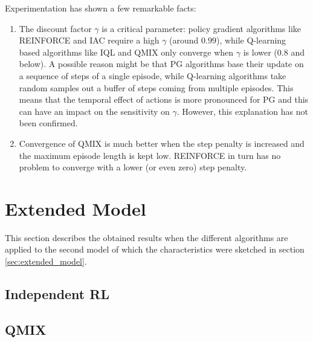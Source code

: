Experimentation has shown a few remarkable facts:
\begin{enumerate}
    \item The discount factor $\gamma$ is a critical parameter: policy gradient algorithms like REINFORCE and IAC require a high $\gamma$ (around $0.99$), while Q-learning based algorithms like IQL and QMIX only converge when $\gamma$ is lower ($0.8$ and below). A possible reason might be that PG algorithms base their update on a sequence of steps of a single episode, while Q-learning algorithms take random samples out a buffer of steps coming from multiple episodes. This means that the temporal effect of actions is more pronounced for PG and this can have an impact on the sensitivity on $\gamma$. However, this explanation has not been confirmed.
    \item Convergence of QMIX is much better when the step penalty is increased and the maximum episode length is kept low. REINFORCE in turn has no problem to converge with a lower (or even zero) step penalty.
\end{enumerate}

\section{Extended Model}
This section describes the obtained results when the different algorithms are applied to the second model of which the characteristics were sketched in section \ref{sec:extended_model}.
\subsection{Independent RL}
\subsection{QMIX}


